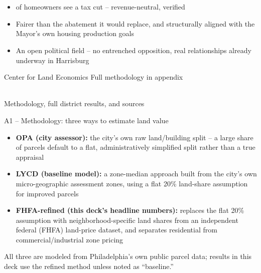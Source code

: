 \documentclass[aspectratio=169,11pt]{beamer}
\begin{document}
\begin{darkframe}
\\[1.0em]
\\[1.2em]
\begin{itemize}
\item \PhlSfrWinRateRefined{} of homeowners see a tax cut -- revenue-neutral, verified
\item Fairer than the abatement it would replace, and structurally aligned with the Mayor's own housing production goals
\item An open political field -- no entrenched opposition, real relationships already underway in Harrisburg
\end{itemize}
\vfill
{\footnotesize\color{deckmuted} Center for Land Economics \quad\textbullet\quad Full methodology in appendix}
\end{darkframe}

\begin{darkframe}
\\[0.6em]
{\small\color{decktint} Methodology, full district results, and sources}
\end{darkframe}

\begin{frame}{A1 -- Methodology: three ways to estimate land value}
\begin{itemize}
\item \textbf{OPA (city assessor):} the city's own raw land/building split -- a large share of parcels default to a flat, administratively simplified split rather than a true appraisal
\item \textbf{LYCD (baseline model):} a zone-median approach built from the city's own micro-geographic assessment zones, using a flat 20\% land-share assumption for improved parcels %
\item \textbf{FHFA-refined (this deck's headline numbers):} replaces the flat 20\% assumption with neighborhood-specific land shares from an independent federal (FHFA) land-price dataset, and separates residential from commercial/industrial zone pricing %
\end{itemize}
\vspace{0.6em}
{\footnotesize\color{deckmuted} All three are modeled from Philadelphia's own public parcel data; results in this deck use the refined method unless noted as ``baseline.''}
\end{frame}
\end{document}
